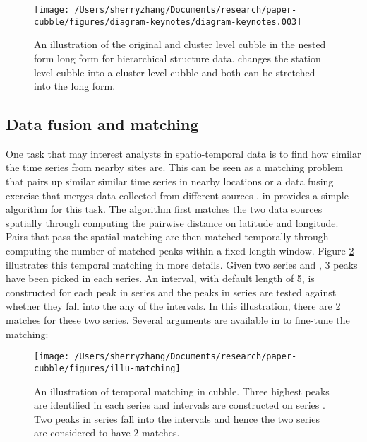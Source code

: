 \documentclass[
]{jss}
\begin{document}
\begin{CodeChunk}
\begin{figure}

{\centering \texttt{[image: /Users/sherryzhang/Documents/research/paper-cubble/figures/diagram-keynotes/diagram-keynotes.003]} 

}

\caption[An illustration of the original and cluster level cubble in the nested form long form for hierarchical structure data]{An illustration of the original and cluster level cubble in the nested form long form for hierarchical structure data.  changes the station level cubble into a cluster level cubble and both can be stretched into the long form.}\label{fig:illu-hier}
\end{figure}
\end{CodeChunk}

\hypertarget{data-fusion-and-matching}{%
\subsection{Data fusion and matching}\label{data-fusion-and-matching}}

One task that may interest analysts in spatio-temporal data is to find how similar the time series from nearby sites are. This can be seen as a matching problem \citep{stuart2010matching, mcintosh2018using} that pairs up similar similar time series in nearby locations or a data fusing exercise that merges data collected from different sources \citep{cocchi2019data}.  in  provides a simple algorithm for this task. The algorithm first matches the two data sources spatially through computing the pairwise distance on latitude and longitude. Pairs that pass the spatial matching are then matched temporally through computing the number of matched peaks within a fixed length window. Figure \ref{fig:illu-matching} illustrates this temporal matching in more details. Given two series  and , 3 peaks have been picked in each series. An interval, with default length of 5, is constructed for each peak in series  and the peaks in series  are tested against whether they fall into the any of the intervals. In this illustration, there are 2 matches for these two series. Several arguments are available in  to fine-tune the matching:

\begin{CodeChunk}
\begin{figure}

{\centering \texttt{[image: /Users/sherryzhang/Documents/research/paper-cubble/figures/illu-matching]} 

}

\caption{An illustration of temporal matching in cubble. Three highest peaks are identified in each series and intervals are constructed on series . Two peaks in series  fall into the intervals and hence the two series are considered to have 2 matches.}\label{fig:illu-matching}
\end{figure}
\end{CodeChunk}
\end{document}
